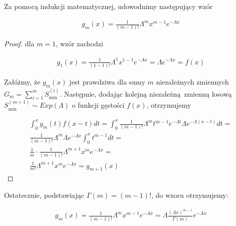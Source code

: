 \documentclass[a4paper,11pt]{article}
\theoremstyle{mytheor}
\begin{document}
Za pomocą indukcji matematycznej, udowodnimy następujący wzór

\begin{align*}
    g_m(x) = \frac{1}{(m-1)!}\Lambda^mx^{m-1}e^{-\Lambda x}
\end{align*}


\begin{proof}
    dla $m = 1$, wzór zachodzi
    
    \begin{align*}
        g_1(x) = \frac{1}{(1-1)!}\Lambda^1x^{1-1}e^{-\Lambda x} = \Lambda e^{-\Lambda x} = f(x)
    \end{align*}
    
    Załóżmy, że $g_m(x)$ jest prawdziwa dla sumy $m$ niezależnych zmiennych $G_m = \sum_{i=1}^m S_{\text{min}}^{(i)}$. Następnie, dodając kolejną niezależną zmienną losową $S_{\text{min}}^{(m+1)} \sim Exp(\Lambda)$ o funkcji gęstości $f(x)$, otrzymujemy
    
    \begin{align*}
        \int_0^x g_m(t)f(x-t)dt =
        \int_0^x \frac{1}{(m-1)!} \Lambda^m t^{m-1} e^{-\Lambda t} \Lambda e^{-\Lambda (x-t)} dt = \\
        \frac{1}{(m-1)!} \Lambda^m \Lambda e^{-\Lambda x} \int_0^x t^{m-1} dt =                    \\
        \frac{1}{m} \cdot \frac{1}{(m-1)!} \Lambda^{m+1} x^m e^{-\Lambda x} =                      \\
        \frac{1}{m!} \Lambda^{m+1} x^m e^{-\Lambda x} = g_{m+1}(x)
    \end{align*}
\end{proof}

Ostatecznie, podstawiając $\Gamma(m) = (m-1)!$, do wzoru otrzymujemy:

\begin{align*}
    g_m(x) = \frac{1}{(m-1)!}\Lambda^mx^{m-1}e^{-\Lambda x} = \Lambda\frac{(\Lambda x)^{m-1}}{\Gamma(m)}e^{-\Lambda x}
\end{align*}
\end{document}
